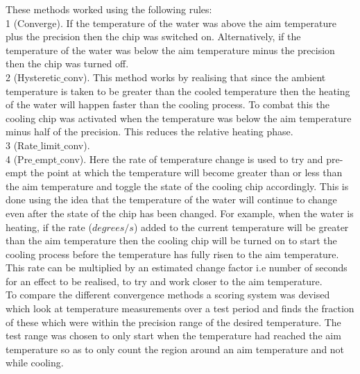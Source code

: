 \documentclass[10pt]{article}
\begin{document}
These methods worked using the following rules:\\ %

1 (Converge). If the temperature of the water was above the aim temperature plus the precision then the chip was switched on. Alternatively, if the temperature of the water was below the aim temperature minus the precision then the chip was turned off.\\

2 (Hysteretic$\_$conv). This method works by realising that since the ambient temperature is taken to be greater than the cooled temperature then the heating of the water will happen faster than the cooling process. To combat this the cooling chip was activated when the temperature was below the aim temperature minus half of the precision. This reduces the relative heating phase.\\

3 (Rate$\_$limit$\_$conv). \\

4 (Pre$\_$empt$\_$conv). Here the rate of temperature change is used to try and pre-empt the point at which the temperature will become greater than or less than the aim temperature and toggle the state of the cooling chip accordingly. This is done using the idea that the temperature of the water will continue to change even after the state of the chip has been changed. For example, when the water is heating, if the rate ($degrees/s$) added to the current temperature will be greater than the aim temperature then the cooling chip will be turned on to start the cooling process before the temperature has fully risen to the aim temperature. This rate can be multiplied by an estimated change factor i.e number of seconds for an effect to be realised, to try and work closer to the aim temperature.\\

To compare the different convergence methods a scoring system was devised which look at temperature measurements over a test period and finds the fraction of these which were within the precision range of the desired temperature. The test range was chosen to only start when the temperature had reached the aim temperature so as to only count the region around an aim temperature and not while cooling. \\
\end{document}

